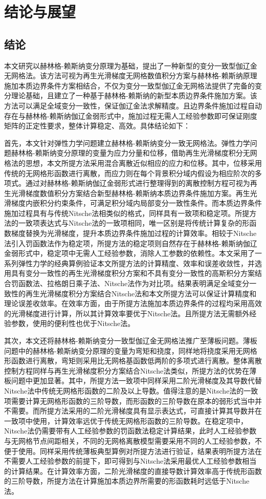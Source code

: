 \chapter{结论与展望}
\section{结论}
本文研究以赫林格-赖斯纳变分原理为基础，提出了一种新型的变分一致型伽辽金无网格法。该方法可视为再生光滑梯度无网格数值积分方案与赫林格-赖斯纳原理施加本质边界条件方案相结合，不仅为变分一致型伽辽金无网格法提供了完备的变分理论基础，且建立了一种基于赫林格-赖斯纳的新型本质边界条件施加方案。该方法可以满足全域变分一致性，保证伽辽金法求解精度。且边界条件施加过程自动存在与赫林格-赖斯纳伽辽金弱形式中，施加过程无需人工经验参数即可保证刚度矩阵的正定性要求，整体计算稳定、高效。具体结论如下：

首先，本文针对弹性力学问题建立赫林格-赖斯纳变分一致无网格法。弹性力学问题赫林格-赖斯纳变分原理的变量为应力分量和位移，借助再生光滑梯度积分无网格法的思想，本文所提方法采用混合离散近似相应的应力和位移。其中，位移采用传统的无网格形函数进行离散，而应力则在每个背景积分域内假设为相应阶次的多项式。通过对赫林格-赖斯纳伽辽金弱形式进行整理得到的离散控制方程可视为再生光滑梯度数值积分方案结合新型赫林格-赖斯纳本质边界条件施加方案。再生光滑梯度内嵌积分约束条件，可满足积分域内局部变分一致性条件。而本质边界条件施加过程具有与传统Nitsche法相类似的格式，同样具有一致项和稳定项。所提方法的一致项表达式与Nitsche法的一致项相同，唯一区别是将传统计算复杂的形函数梯度替换为光滑梯度，提升本质边界条件施加过程的计算效率。相较于Nitsche法引入罚函数法作为稳定项，所提方法的稳定项则自然存在于赫林格-赖斯纳伽辽金弱形式中，稳定项中无需人工经验参数，消除人工参数的依赖性。本文采用了一系列弹性力学的经典算例验证本文所提方法的计算精度、效率和误差收敛性，并选用具有变分一致性的再生光滑梯度积分方案和不具有变分一致性的高斯积分方案结合罚函数法、拉格朗日乘子法、Nitsche法作为对比项。结果表明满足全域变分一致性的再生光滑梯度积分方案结合Nitsche法和本文所提方法可以保证计算精度和理论误差收敛率。在效率方面，由于所提方法施加本质边界条件的过程均采用高效的光滑梯度进行计算，所以其计算效率要优于Nitsche法。且所提方法无需额外经验参数，使用的便利性也优于Nitsche法。

其次，本文还将赫林格-赖斯纳变分一致型伽辽金无网格法推广至薄板问题。薄板问题中的赫林格-赖斯纳变分原理的变量为弯矩和挠度，同样地将挠度采用无网格形函数进行离散，弯矩则采用比无网格基函数低两阶的多项式进行离散。整体离散控制方程同样与再生光滑梯度积分方案结合Nitsche法类似，所提方法的优势在薄板问题中更加显著。其中，所提方法一致项中同样采用二阶光滑梯度及其导数代替Nitsche法中传统无网格形函数的二阶及以上导数。值得注意的是Nitsche法的一致项需要计算无网格形函数的三阶导数，而形函数的三阶导数在原本的弱形式当中并不需要。而所提方法采用的二阶光滑梯度具有显示表达式，可直接计算其导数并在一致项中使用，计算效率远优于传统无网格形函数的三阶导数。在稳定项中，Nitsche法仍需要带有人工经验参数的罚函数法稳定计算结果，此时人工经验参数与无网格节点间距相关，不同的无网格离散模型需要采用不同的人工经验参数，不便于使用。同样采用传统薄板典型算例对所提方法进行验证，结果表明所提方法在不需要人工经验参数的前提下，即可得到与Nitsche法采用最优人工经验参数相当的计算结果。在计算效率方面，二阶光滑梯度的直接导数计算效率高于传统形函数的三阶导数，所提方法在计算施加本质边界所需要的形函数耗时远低于Nitsche法。

